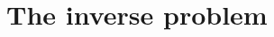 \documentclass[12pt,a4paper]{article}
\begin{document}
\section{The inverse problem} \label{The inverse problem}
%
%
\end{document}
